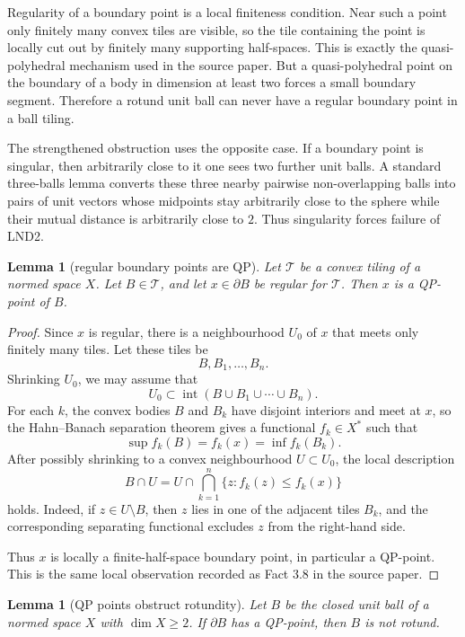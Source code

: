 \documentclass[11pt]{amsart}
\newtheorem{lemma}[theorem]{Lemma}
\theoremstyle{definition}
\theoremstyle{remark}
\newcommand{\T}{\mathcal T}
\newcommand{\intt}{\operatorname{int}}
\begin{document}
Regularity of a boundary point is a local finiteness condition. Near such a
point only finitely many convex tiles are visible, so the tile containing the
point is locally cut out by finitely many supporting half-spaces. This is
exactly the quasi-polyhedral mechanism used in the source paper. But a
quasi-polyhedral point on the boundary of a body in dimension at least two
forces a small boundary segment. Therefore a rotund unit ball can never have a
regular boundary point in a ball tiling.

The strengthened obstruction uses the opposite case. If a boundary point is
singular, then arbitrarily close to it one sees two further unit balls. A
standard three-balls lemma converts these three nearby pairwise non-overlapping
balls into pairs of unit vectors whose midpoints stay arbitrarily close to the
sphere while their mutual distance is arbitrarily close to \(2\). Thus
singularity forces failure of LND2.

\begin{lemma}[regular boundary points are QP]\label{lem:regular-qp}
Let \(\T\) be a convex tiling of a normed space \(X\). Let \(B\in\T\), and let
\(x\in\partial B\) be regular for \(\T\). Then \(x\) is a QP-point of \(B\).
\end{lemma}

\begin{proof}
Since \(x\) is regular, there is a neighbourhood \(U_0\) of \(x\) that meets
only finitely many tiles. Let these tiles be
\[
  B,B_1,\ldots,B_n.
\]
Shrinking \(U_0\), we may assume that
\[
  U_0\subset \intt(B\cup B_1\cup\cdots\cup B_n).
\]
For each \(k\), the convex bodies \(B\) and \(B_k\) have disjoint interiors and
meet at \(x\), so the Hahn--Banach separation theorem gives a functional
\(f_k\in X^*\) such that
\[
  \sup f_k(B)=f_k(x)=\inf f_k(B_k).
\]
After possibly shrinking to a convex neighbourhood \(U\subset U_0\), the local
description
\[
  B\cap U
  =
  U\cap\bigcap_{k=1}^n\{z:f_k(z)\leq f_k(x)\}
\]
holds. Indeed, if \(z\in U\setminus B\), then \(z\) lies in one of the adjacent
tiles \(B_k\), and the corresponding separating functional excludes \(z\) from
the right-hand side.

Thus \(x\) is locally a finite-half-space boundary point, in particular a
QP-point. This is the same local observation recorded as Fact 3.8 in the
source paper.
\end{proof}

\begin{lemma}[QP points obstruct rotundity]\label{lem:qp-rotund}
Let \(B\) be the closed unit ball of a normed space \(X\) with
\(\dim X\geq 2\). If \(\partial B\) has a QP-point, then \(B\) is not rotund.
\end{lemma}
\end{document}
